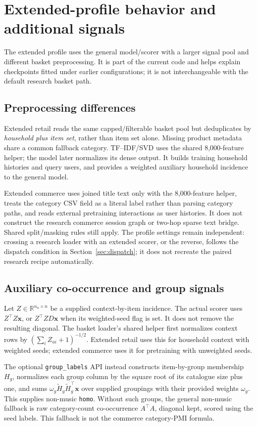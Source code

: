 \documentclass[11pt,a4paper]{article}
\newcommand{\code}[1]{\nolinkurl{#1}}
\newcommand{\R}{\mathbb R}
\numberwithin{equation}{section}
\begin{document}
\appendix
\section{Extended-profile behavior and additional signals}\label{app:extended}
The extended profile uses the general model/scorer with a larger signal pool and different
basket preprocessing. It is part of the current code and helps explain checkpoints fitted
under earlier configurations; it is not interchangeable with the default research basket path.

\subsection{Preprocessing differences}
Extended retail reads the same capped/filterable basket pool but deduplicates by
\emph{household plus item set}, rather than item set alone. Missing product metadata share
a common fallback category. TF--IDF/SVD uses the shared 8,000-feature helper; the model
later normalizes its dense output. It builds training household histories and query users,
and provides a weighted auxiliary household incidence to the general model.

Extended commerce uses joined title text only with the 8,000-feature helper, treats the
category CSV field as a literal label rather than parsing category paths, and reads external
pretraining interactions as user histories. It does not construct the research commerce
session graph or two-hop sparse text bridge. Shared split/masking rules still apply.
The profile settings remain independent: crossing a research loader with an extended scorer,
or the reverse, follows the dispatch condition in Section~\ref{sec:dispatch}; it does not
recreate the paired research recipe automatically.

\subsection{Auxiliary co-occurrence and group signals}
Let $Z\in\R^{n_u\times n}$ be a supplied context-by-item incidence. The actual scorer
uses $Z^\top Z\bm x$, or $Z^\top ZD\bm x$ when its weighted-seed flag is set. It does
not remove the resulting diagonal. The basket loader's shared helper first normalizes
context rows by $(\sum_i Z_{ui}+1)^{-1/2}$. Extended retail uses this for household context
with weighted seeds; extended commerce uses it for pretraining with unweighted seeds.

The optional \code{group_labels} API instead constructs item-by-group membership $H_g$,
normalizes each group column by the square root of its catalogue size plus one, and sums
$\omega_g\widetilde H_g\widetilde H_g^\top\bm x$ over supplied groupings with their
provided weights $\omega_g$. This supplies non-music \code{homo}. Without such groups,
the general non-music fallback is raw category-count co-occurrence $A^\top A$, diagonal
kept, scored using the seed labels. This fallback is not the commerce category-PMI formula.
\end{document}
